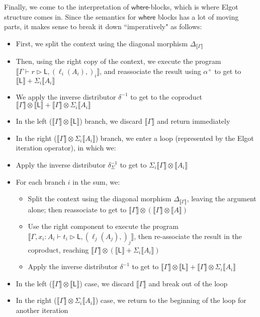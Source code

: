\documentclass[acmsmall,screen,review]{acmart}
\newcommand{\ms}[1]{\ensuremath{\mathsf{#1}}}
\newcommand{\bhyp}[2]{#1 : #2}
\newcommand{\lhyp}[2]{#1(#2)}
\newcommand{\haslb}[3]{#1 \vdash #2 \rhd #3}
\newcommand{\dnt}[1]{\llbracket{#1}\rrbracket}
\begin{document}
Finally, we come to the interpretation of \ms{where}-blocks, which is where Elgot structure comes
in. Since the semantics for \ms{where} blocks has a lot of moving parts, it makes sense to break it
down ``imperatively" as follows:
\begin{itemize}
  \item First, we split the context using the diagonal morphism $\Delta_{\dnt{\Gamma}}$
  \item Then, using the right copy of the context, we execute the program
  $\dnt{\haslb{\Gamma}{r}{\ms{L}, (\lhyp{\ell_i}{A_i},)_i}}$, and reassociate the result using
  $\alpha^+$ to get to $\dnt{\ms{L}} + \Sigma_i\dnt{A_i}$
  \item We apply the inverse distributor $\delta^{-1}$ to get to the coproduct $\dnt{\Gamma} \otimes
  \dnt{\ms{L}} + \dnt{\Gamma} \otimes \Sigma_i \dnt{A_i}$
  \item In the left ($\dnt{\Gamma} \otimes \dnt{\ms{L}}$) branch, we discard $\dnt{\Gamma}$ and
  return immediately
  \item In the right ($\dnt{\Gamma} \otimes \Sigma_i \dnt{A_i}$) branch, we enter a loop
  (represented by the Elgot iteration operator), in which we:
  \item Apply the inverse distributor $\delta^{-1}_{\Sigma}$ to get to 
        $\Sigma_i \dnt{\Gamma} \otimes \dnt{A_i}$
  \item For each branch $i$ in the sum, we:
  \begin{itemize}
    \item Split the context using the diagonal morphism $\Delta_{\dnt{\Gamma}}$, leaving the
    argument alone; then reassociate to get to $\dnt{\Gamma} \otimes (\dnt{\Gamma} \otimes \dnt{A})$
    \item Use the right component to execute the program $\dnt{\haslb{\Gamma,
    \bhyp{x_i}{A_i}}{t_i}{\ms{L}, (\lhyp{\ell_j}{A_j},)_j}}$, then re-associate the result in the
    coproduct, reaching $\dnt{\Gamma} \otimes (\dnt{\ms{L}} + \Sigma_i\dnt{A_i})$
    \item Apply the inverse distributor $\delta^{-1}$ to get to 
      $\dnt{\Gamma} \otimes \dnt{\ms{L}} + \dnt{\Gamma} \otimes \Sigma_i\dnt{A_i}$
  \end{itemize}
  \item In the left ($\dnt{\Gamma} \otimes \dnt{\ms{L}}$) case, we discard $\dnt{\Gamma}$ and break
  out of the loop
  \item In the right ($\dnt{\Gamma} \otimes \Sigma_i\dnt{A_i}$) case, we return to the beginning
  of the loop for another iteration
\end{itemize}
\end{document}
